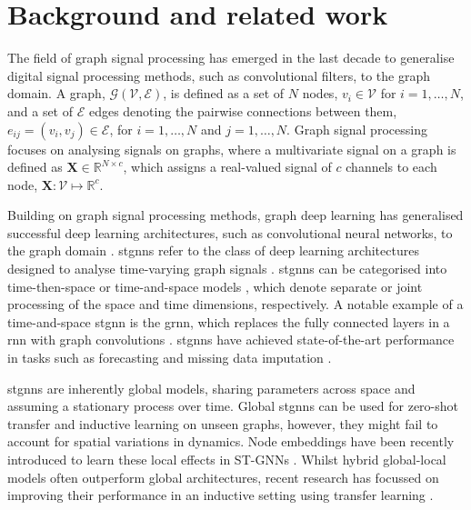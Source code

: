 \section{Background and related work}
\label{sec:background}
The field of graph signal processing \cite{8347162, mandicFTMLp2} has emerged in the last decade to generalise digital signal processing methods, such as convolutional filters, to the graph domain. A graph, $\mathcal{G}(\mathcal{V}, \mathcal{E})$, is defined as a set of $N$ nodes, $v_i \in \mathcal{V}$ for $i = 1, \ldots, N$, and a set of $\mathcal{E}$ edges denoting the pairwise connections between them, $e_{ij} = (v_i, v_j) \in \mathcal{E}$, for $i = 1, \ldots, N$ and $j = 1, \ldots, N$. Graph signal processing focuses on analysing signals on graphs, where a multivariate signal on a graph is defined as $\mathbf{X} \in \mathbb{R}^{N\times c}$, which assigns a real-valued signal of $c$ channels to each node, $\mathbf{X}: \mathcal{V} \mapsto \mathbb{R}^c$.

Building on graph signal processing methods, graph deep learning \cite{bronstein2017geometric, mandicFTMLp3} has generalised successful deep learning architectures, such as convolutional neural networks, to the graph domain \cite{kipf2016semi-supervised, zhang2020deep}. \Glspl{stgnn} refer to the class of deep learning architectures designed to analyse time-varying graph signals \cite{cini2023graphdeeplearningtime, jin2024survey}. \Glspl{stgnn} can be categorised into time-then-space \cite{gao2022equivalence, cini2023scalable} or time-and-space models \cite{seo2018structured, li2018diffusionconvolutionalrecurrentneural, marisca2022learning}, which denote separate or joint processing of the space and time dimensions, respectively. A notable example of a time-and-space \gls{stgnn} is the \gls{grnn}, which replaces the fully connected layers in a \gls{rnn} with graph convolutions \cite{seo2018structured, li2018diffusionconvolutionalrecurrentneural}. \Glspl{stgnn} have achieved state-of-the-art performance in tasks such as forecasting \cite{jiang2022graph, lam2023learning, cini2023graph-based} and missing data imputation \cite{marisca2022learning, cini2021filling}.

\glspl{stgnn} are inherently global models, sharing parameters across space and assuming a stationary process over time. Global \glspl{stgnn} can be used for zero-shot transfer and inductive learning on unseen graphs, however, they might fail to account for spatial variations in dynamics. Node embeddings have been recently introduced to learn these local effects in ST-GNNs \cite{cini2024taming}. Whilst hybrid global-local models often outperform global architectures, recent research has focussed on improving their performance in an inductive setting using transfer learning \cite{cini2024taming, yin2022nodetrans}.

